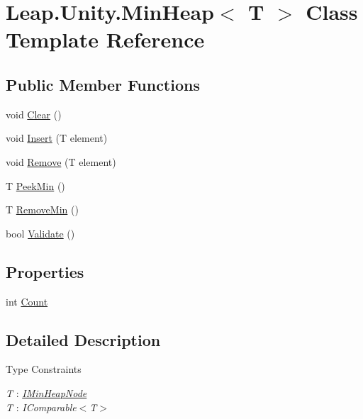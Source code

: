 \hypertarget{class_leap_1_1_unity_1_1_min_heap}{}\section{Leap.\+Unity.\+Min\+Heap$<$ T $>$ Class Template Reference}
\label{class_leap_1_1_unity_1_1_min_heap}
\subsection*{Public Member Functions}
\begin{DoxyCompactItemize}
\item 
void \mbox{\hyperlink{class_leap_1_1_unity_1_1_min_heap_a8496d10f15870cb9a6929db24e95622e}{Clear}} ()
\item 
void \mbox{\hyperlink{class_leap_1_1_unity_1_1_min_heap_a5be89c0c6f35537ce75c92d6b0d80255}{Insert}} (T element)
\item 
void \mbox{\hyperlink{class_leap_1_1_unity_1_1_min_heap_ad383b9e47ce6d0324edcc9eda5b089de}{Remove}} (T element)
\item 
T \mbox{\hyperlink{class_leap_1_1_unity_1_1_min_heap_a5bb42731474ab0432008386e3941ea8a}{Peek\+Min}} ()
\item 
T \mbox{\hyperlink{class_leap_1_1_unity_1_1_min_heap_a23bfa5babc3a4e4827675b4e935663d7}{Remove\+Min}} ()
\item 
bool \mbox{\hyperlink{class_leap_1_1_unity_1_1_min_heap_aab63796b0e8d31cc957fd9e6ccfe6775}{Validate}} ()
\end{DoxyCompactItemize}
\subsection*{Properties}
\begin{DoxyCompactItemize}
\item 
int \mbox{\hyperlink{class_leap_1_1_unity_1_1_min_heap_a61f29a6626cf9ff04ec8a066dd39d1c1}{Count}}
\end{DoxyCompactItemize}


\subsection{Detailed Description}
\begin{Desc}
\item[Type Constraints]\begin{description}
\item[{\em T} : {\em \mbox{\hyperlink{interface_leap_1_1_unity_1_1_i_min_heap_node}{I\+Min\+Heap\+Node}}}]\item[{\em T} : {\em I\+Comparable$<$T$>$}]\end{description}
\end{Desc}


